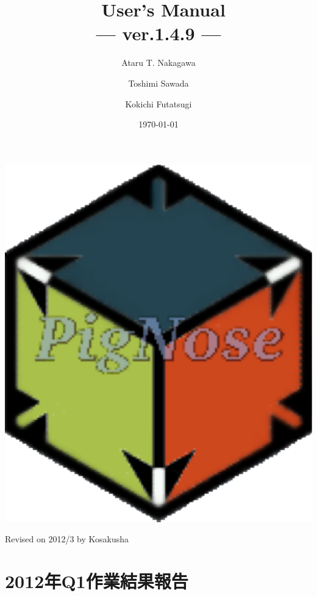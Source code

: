 \documentclass[a4paper]{memoir}
\begin{document}
\tightlists
\midsloppy
{}
\frontmatter
\pagestyle{empty}
\title{\cafeobj~User's Manual \\ --- ver.1.4.9 ---}
\author{Ataru T. Nakagawa \and Toshimi Sawada \and Kokichi Futatsugi}
\date{\today}


\maketitle
\vfill
\begin{center}
\includegraphics[scale=0.2]{cafe-logo.pdf}
\end{center}
\vfill
\Hline
\begin{center}
\footnotesize{Revised on 2012/3 by Kosakusha}
\end{center}
\thispagestyle{empty}
\clearpage
\newpage
{}
\tableofcontents
\clearpage
{}
\chapter{2012年Q1作業結果報告}
\end{document}
